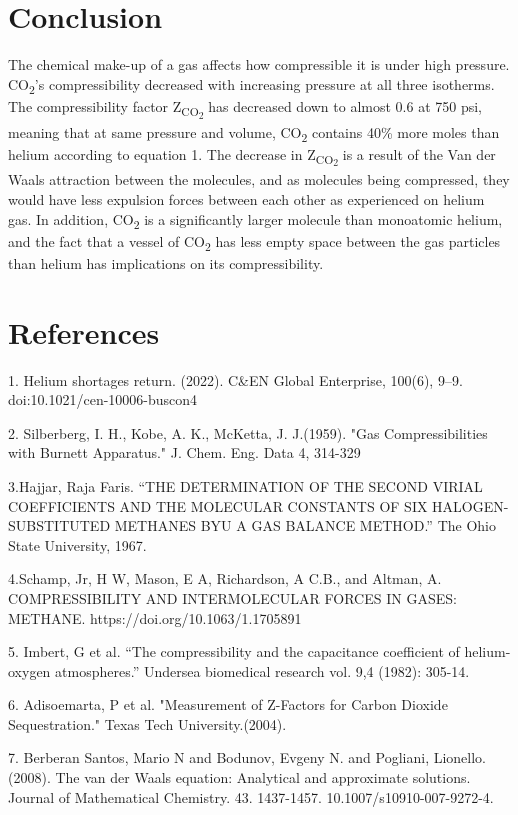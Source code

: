 \documentclass{article}
\begin{document}
\section*{Conclusion}
The chemical make-up of a gas affects how compressible it is under high pressure. CO{{\textsubscript{2}}}'s compressibility decreased with increasing pressure at all three isotherms. The compressibility factor Z{{\textsubscript{CO{{\textsubscript{2}}}}}} has decreased down to almost 0.6 at 750 psi, meaning that at same pressure and volume, CO{{\textsubscript{2}}} contains 40{\%} more moles than helium according to equation 1. The decrease in Z{{\textsubscript{CO{{\textsubscript{2}}}}}} is a result of the Van der Waals attraction between the molecules, and as molecules being compressed, they would have less expulsion forces between each other as experienced on helium gas. In addition, CO{{\textsubscript{2}}} is a significantly larger molecule than monoatomic helium, and the fact that a vessel of CO{{\textsubscript{2}}} has less empty space between the gas particles than helium has implications on its compressibility.
\newpage \section*{References} 
1. Helium shortages return. (2022). C\&EN Global Enterprise, 100(6), 9–9. doi:10.1021/cen-10006-buscon4

2. Silberberg, I. H., Kobe, A. K., McKetta, J. J.(1959). "Gas Compressibilities with Burnett Apparatus." J. Chem. Eng. Data 4, 314-329 

3.Hajjar, Raja Faris. “THE DETERMINATION OF THE SECOND VIRIAL COEFFICIENTS AND THE MOLECULAR CONSTANTS OF SIX HALOGEN-SUBSTITUTED METHANES BYU A GAS BALANCE METHOD.” The Ohio State University, 1967.

4.Schamp, Jr, H W, Mason, E A, Richardson, A C.B., and Altman, A. COMPRESSIBILITY AND INTERMOLECULAR FORCES IN GASES: METHANE. https://doi.org/10.1063/1.1705891

5. Imbert, G et al. “The compressibility and the capacitance coefficient of helium-oxygen atmospheres.” Undersea biomedical research vol. 9,4 (1982): 305-14. 

6. Adisoemarta, P et al. "Measurement of Z-Factors for Carbon Dioxide Sequestration." Texas Tech University.(2004). 

7. Berberan Santos, Mario N and Bodunov, Evgeny N. and Pogliani, Lionello. (2008). The van der Waals equation: Analytical and approximate solutions. Journal of Mathematical Chemistry. 43. 1437-1457. 10.1007/s10910-007-9272-4. 
\end{document}
